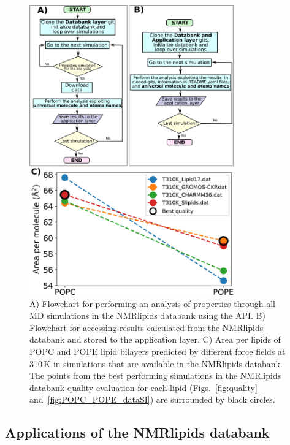 \documentclass[fleqn,10pt]{wlscirep}
\begin{document}
\begin{figure}[t]
    \centering
    \includegraphics[width=88mm]{Figures/flowchart2.pdf}
    \caption{ A) Flowchart for performing an analysis of properties through all MD simulations in the NMRlipids databank using the API.
    B) Flowchart for accessing results calculated from the NMRlipids databank and stored to the application layer.
    C) Area per lipids of POPC and POPE lipid bilayers predicted by different force fields at 310\,K in simulations that are available in the NMRlipids databank. The points from the best performing simulations in the NMRlipids databank quality evaluation for each lipid (Figs.~\ref{fig:quality} and~\ref{fig:POPC_POPE_dataSI}) are surrounded by black circles. 
    }
    \label{fig:POPCPOPEapls}
\end{figure}

\subsection{Applications of the NMRlipids databank}
\end{document}
